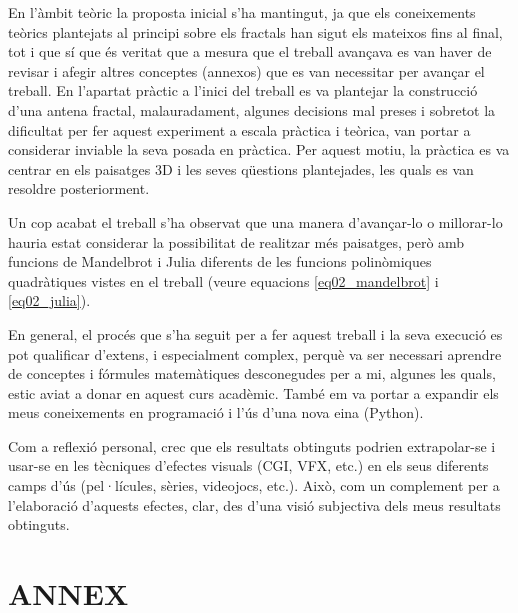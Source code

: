 \documentclass[12pt,a4paper]{report}
\begin{document}
En l'àmbit teòric la proposta inicial s’ha mantingut, ja que els coneixements teòrics plantejats al principi sobre els fractals han sigut els mateixos fins al final, tot i que sí que és veritat que a mesura que el treball avançava es van haver de revisar i afegir altres conceptes (annexos) que es van necessitar per avançar el treball. En l'apartat pràctic a l'inici del treball es va plantejar la construcció d'una antena fractal, malauradament, algunes decisions mal preses i sobretot la dificultat per fer aquest experiment a escala pràctica i teòrica, van portar a considerar inviable la seva posada en pràctica. Per aquest motiu, la pràctica es va centrar en els paisatges 3D i les seves qüestions plantejades, les quals es van resoldre posteriorment.

Un cop acabat el treball s'ha observat que una manera d'avançar-lo o millorar-lo hauria estat considerar la possibilitat de realitzar més paisatges, però amb funcions de Mandelbrot i Julia diferents de les funcions polinòmiques quadràtiques vistes en el treball (veure equacions \ref{eq02_mandelbrot} i \ref{eq02_julia}).

En general, el procés que s'ha seguit per a fer aquest treball i la seva execució es pot qualificar d'extens, i especialment complex, perquè va ser necessari aprendre de conceptes i fórmules matemàtiques desconegudes per a mi, algunes les quals, estic aviat a donar en aquest curs acadèmic. També em va portar a expandir els meus coneixements en programació i l'ús d'una nova eina (Python).

Com a reflexió personal, crec que els resultats obtinguts podrien extrapolar-se i usar-se en les tècniques d'efectes visuals (CGI, VFX, etc.) en els seus diferents camps d'ús (pel·lícules, sèries, videojocs, etc.). Això, com un complement per a l'elaboració d'aquests efectes, clar, des d'una visió subjectiva dels meus resultats obtinguts.

\chapter{ANNEX}
\end{document}
